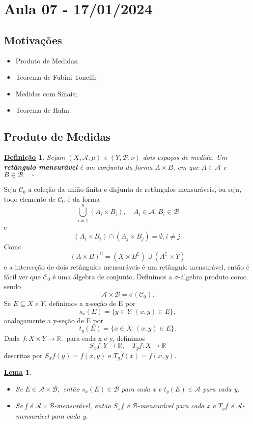 \documentclass{article}
\newtheorem*{def*}{\underline{Defini\c c\~ao}}
\newtheorem*{lemma*}{\underline{Lema}}
\begin{document}
\newpage

\section{Aula 07 - 17/01/2024}
\subsection{Motivações}
\begin{itemize}
  \item Produto de Medidas; 
  \item Teorema de Fubini-Tonelli;
  \item Medidas com Sinais;
  \item Teorema de Hahn.
\end{itemize}
\subsection{Produto de Medidas}
\begin{def*}
  Sejam \((X, \mathcal{A}, \mu )\) e \((Y, \mathcal{B}, \nu)\) dois espaços de medida. Um \textbf{retângulo mensurável} é um 
  conjunto da forma \(A\times B\), em que \(A\in \mathcal{A}\) e \(B\in \mathcal{B}.\quad \square\)
\end{def*}
Seja \(\mathcal{C}_{0}\) a coleção da união finita e disjunta de retângulos mensuráveis, ou seja, todo elemento de \(\mathcal{C}_{0}\) é da forma 
  \[
    \bigcup_{i=1}^{n}(A_{i}\times B_{i}),\quad A_{i}\in \mathcal{A}, B_{i}\in \mathcal{B}
  \]
e 
  \[
    (A_{i}\times B_{i})\cap (A_{j}\times B_{j}) = \emptyset , i\neq j.
  \]
  Como 
    \[
      (A\times B)^{\complement} = (X\times B ^{\complement})\cup (A ^{\complement}\times Y)
    \]
    e a interseção de dois retângulos mensuráveis é um retângulo mensurável, então é fácil ver que \(\mathcal{C}_{0}\) é uma álgebra de conjunto. Definimos a \(\sigma \)-álgebra produto como sendo 
      \[
        \mathcal{A}\times \mathcal{B} = \sigma (\mathcal{C}_{0}).
      \]
    Se \(E\subseteq X\times Y\), definimos a x-seção de E por 
      \[
        s_x(E) = \{y\in Y: (x, y)\in E\},
      \]
    analogamente a y-seção de E por 
      \[
        t_y(E) = \{x\in X: (x, y)\in E\}.
      \]
    Dada \(f:X\times Y\rightarrow \mathbb{R},\) para cada x e y, definimos 
      \[
        S_{x}f :Y\rightarrow \mathbb{R}, \quad T_{y}f:X\rightarrow \mathbb{R}
      \]
    descritas por \(S_xf(y) = f(x, y)\) e \(T_yf(x) = f(x, y).\)
\begin{lemma*}
 \begin{itemize}
   \item[1)] Se \(E\in \mathcal{A}\times \mathcal{B},\) então \(s_x(E)\in \mathcal{B}\) para cada x e \(t_y(E)\in \mathcal{A}\) para cada y.
   \item[2)] Se f é \(\mathcal{A}\times \mathcal{B}\)-mensurável, então \(S_{x}f\) é \(\mathcal{B}\)-mensurável para cada x e \(T_yf\) é \(\mathcal{A}\)-mensurável para cada y.
 \end{itemize}
\end{lemma*}
\end{document}
